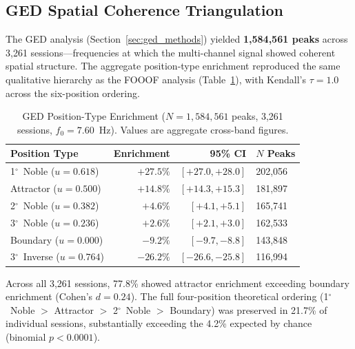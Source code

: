 \documentclass[11pt,a4paper]{article}
\newcommand{\degree}{$^\circ$}  %
\newcommand{\fzero}{f_0}
\begin{document}
\subsection{GED Spatial Coherence Triangulation}
\label{sec:ged}

The GED analysis (Section~\ref{sec:ged_methods}) yielded \textbf{1,584,561 peaks} across 3,261 sessions---frequencies at which the multi-channel signal showed coherent spatial structure. The aggregate position-type enrichment reproduced the same qualitative hierarchy as the FOOOF analysis (Table~\ref{tab:ged_enrichment}), with Kendall's $\tau = 1.0$ across the six-position ordering.

\begin{table}[H]
\centering
\caption{GED Position-Type Enrichment ($N = 1{,}584{,}561$ peaks, 3,261 sessions, $\fzero = 7.60$~Hz). Values are aggregate cross-band figures.}
\label{tab:ged_enrichment}
\small
\begin{tabular}{@{}lrrl@{}}
\toprule
Position Type & Enrichment & 95\% CI & $N$ Peaks \\
\midrule
1\degree\ Noble ($u = 0.618$) & $+27.5\%$ & $[+27.0, +28.0]$ & 202,056 \\
Attractor ($u = 0.500$) & $+14.8\%$ & $[+14.3, +15.3]$ & 181,897 \\
2\degree\ Noble ($u = 0.382$) & $+4.6\%$ & $[+4.1, +5.1]$ & 165,741 \\
3\degree\ Noble ($u = 0.236$) & $+2.6\%$ & $[+2.1, +3.0]$ & 162,533 \\
Boundary ($u = 0.000$) & $-9.2\%$ & $[-9.7, -8.8]$ & 143,848 \\
3\degree\ Inverse ($u = 0.764$) & $-26.2\%$ & $[-26.6, -25.8]$ & 116,994 \\
\bottomrule
\end{tabular}
\end{table}

Across all 3,261 sessions, 77.8\% showed attractor enrichment exceeding boundary enrichment (Cohen's $d = 0.24$). The full four-position theoretical ordering (1\degree\ Noble $>$ Attractor $>$ 2\degree\ Noble $>$ Boundary) was preserved in 21.7\% of individual sessions, substantially exceeding the 4.2\% expected by chance (binomial $p < 0.0001$).
\end{document}
